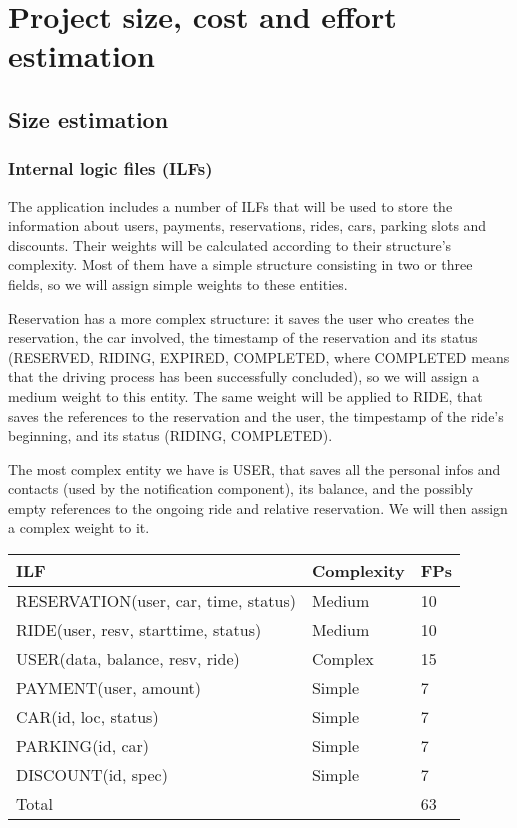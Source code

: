 \chapter{Project size, cost and effort estimation}

\section{Size estimation}

\subsection{Internal logic files (ILFs)}
The application includes a number of ILFs that will be used to store the information about users, payments, reservations, rides, cars, parking slots and discounts. Their weights will be calculated according to their structure's complexity. Most of them have a simple structure consisting in two or three fields, so we will assign simple weights to these entities.

Reservation has a more complex structure: it saves the user who creates the reservation, the car involved, the timestamp of the reservation and its status (RESERVED, RIDING, EXPIRED, COMPLETED, where COMPLETED means that the driving process has been successfully concluded), so we will assign a medium weight to this entity. The same weight will be applied to RIDE, that saves the references to the reservation and the user, the timpestamp of the ride's beginning, and its status (RIDING, COMPLETED).

The most complex entity we have is USER, that saves all the personal infos and contacts (used by the notification component), its balance, and the possibly empty references to the ongoing ride and relative reservation. We will then assign a complex weight to it.

\begin{table}[H]
	\centering
	\begin{tabular}{|l|l|l|}
		\hline
		ILF & Complexity & FPs \\
		\hline
		RESERVATION(user, car, time, status) & Medium & 10 \\
		RIDE(user, resv, starttime, status) & Medium & 10 \\
		USER(data, balance, resv, ride) & Complex & 15 \\
		PAYMENT(user, amount) & Simple & 7 \\
		CAR(id, loc, status) & Simple & 7 \\
		PARKING(id, car) & Simple & 7 \\
		DISCOUNT(id, spec) & Simple & 7 \\
		\hline
		\multicolumn{2}{|l|}{Total} & 63 \\
		\hline	
	\end{tabular}
\end{table}

